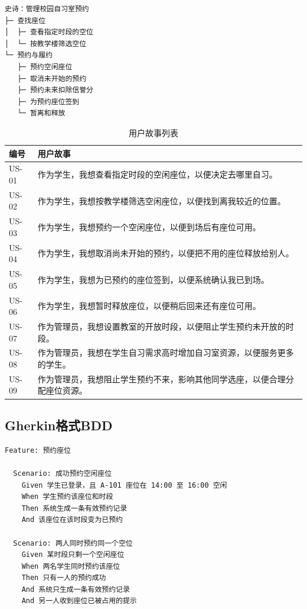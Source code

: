 \documentclass[11pt,a4paper]{article}
\begin{document}
\begin{framed}
\begin{verbatim}
史诗：管理校园自习室预约
├─ 查找座位
│  ├─ 查看指定时段的空位
│  └─ 按教学楼筛选空位
└─ 预约与履约
   ├─ 预约空闲座位
   ├─ 取消未开始的预约
   ├─ 预约未来扣除信誉分
   ├─ 为预约座位签到
   └─ 暂离和释放
\end{verbatim}
\end{framed}

\begin{table}[htbp]
    \centering
    \caption{用户故事列表}
    \begin{tabular}{@{}p{}p{}@{}}
        \toprule
        \textbf{编号} & \textbf{用户故事} \\
        \midrule
        US-01 & 作为学生，我想查看指定时段的空闲座位，以便决定去哪里自习。 \\
        \midrule
        US-02 & 作为学生，我想按教学楼筛选空闲座位，以便找到离我较近的位置。 \\
        \midrule
        US-03 & 作为学生，我想预约一个空闲座位，以便到场后有座位可用。 \\
        \midrule
        US-04 & 作为学生，我想取消尚未开始的预约，以便把不用的座位释放给别人。 \\
        \midrule
        US-05 & 作为学生，我想为已预约的座位签到，以便系统确认我已到场。 \\
        \midrule
        US-06 & 作为学生，我想暂时释放座位，以便稍后回来还有座位可用。 \\
        \midrule
        US-07 & 作为管理员，我想设置教室的开放时段，以便阻止学生预约未开放的时段。 \\
        \midrule
        US-08 & 作为管理员，我想在学生自习需求高时增加自习室资源，以便服务更多的学生。 \\
        \midrule
        US-09 & 作为管理员，我想阻止学生预约不来，影响其他同学选座，以便合理分配座位资源。 \\
        \bottomrule
    \end{tabular}
\end{table}

\subsection{Gherkin格式BDD}

\begin{framed}
\begin{verbatim}
Feature: 预约座位

  Scenario: 成功预约空闲座位
    Given 学生已登录，且 A-101 座位在 14:00 至 16:00 空闲
    When 学生预约该座位和时段
    Then 系统生成一条有效预约记录
    And 该座位在该时段变为已预约

  Scenario: 两人同时预约同一个空位
    Given 某时段只剩一个空闲座位
    When 两名学生同时预约该座位
    Then 只有一人的预约成功
    And 系统只生成一条有效预约记录
    And 另一人收到座位已被占用的提示
\end{verbatim}
\end{framed}
\end{document}
